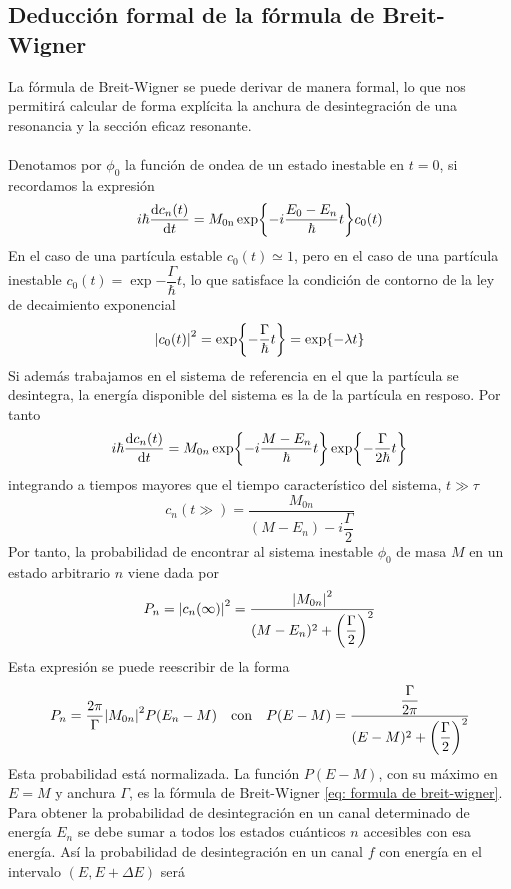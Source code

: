 \subsection{Deducción formal de la fórmula de Breit-Wigner}
La fórmula de Breit-Wigner se puede derivar de manera formal, lo que nos permitirá calcular de forma explícita la anchura de desintegración de una resonancia y la sección eficaz resonante.
\\\\
Denotamos por $\phi_0$ la función de ondea de un estado inestable en $t=0$, si recordamos la expresión
\begin{equation}
    i\hbar \dv{c_n(t)}{t}=M_\mathrm{0n} \exp{-i\frac{E_0-E_n}{\hbar}t} c_0(t)
\end{equation}
En el caso de una partícula estable $c_0(t)\simeq 1$, pero en el caso de una partícula inestable $c_0(t)= \exp{-\dfrac{\Gamma}{\hbar}t}$, lo que satisface la condición de contorno de la ley de decaimiento exponencial 
\begin{equation}
    \abs{c_0(t)}^2=\exp{-\dfrac{\Gamma}{\hbar}t}=\exp{-\lambda t}
\end{equation}
Si además trabajamos en el sistema de referencia en el que la partícula se desintegra, la energía disponible del sistema es la de la partícula en resposo. Por tanto
\begin{equation}
    i\hbar \dv{c_n(t)}{t}=M_{0n} \exp{-i\frac{M-E_n}{\hbar}t}\exp{-\dfrac{\Gamma}{2\hbar}t}
\end{equation}
integrando a tiempos mayores que el tiempo característico del sistema, $t\gg \tau$
\begin{equation}
    c_n(t\gg)=\frac{M_{0n}}{(M-E_n)-i\dfrac{\Gamma}{2}}
\end{equation}
Por tanto, la probabilidad de encontrar al sistema inestable $\phi_0$ de masa $M$ en un estado arbitrario $n$ viene dada por 
\begin{equation}
    P_n=\abs{c_n(\infty)}^2=\frac{\abs{M_{0n}}^2}{(M-E_n)^2+\qty(\dfrac{\Gamma}{2})^2}
\end{equation}
Esta expresión se puede reescribir de la forma 
\begin{equation}
    P_n=\frac{2\pi}{\Gamma} \abs{M_{0n}}^2 P(E_n-M) \quad \text{con} \quad P(E-M)=\frac{\dfrac{\Gamma}{2\pi}}{(E-M)^2+\qty(\dfrac{\Gamma}{2})^2}
\end{equation}
Esta probabilidad está normalizada. La función $P(E-M)$, con su máximo en $E=M$ y anchura $\Gamma$, es la fórmula de Breit-Wigner \ref{eq: formula de breit-wigner}. Para obtener la probabilidad de desintegración en un canal determinado de energía $E_n$ se debe sumar a todos los estados cuánticos $n$ accesibles con esa energía. Así la probabilidad de desintegración en un canal $f$ con energía en el intervalo $(E,E+\Delta E)$ será 
